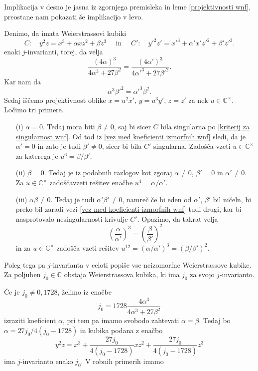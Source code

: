\documentclass[mat1]{fmfdelo}
\newcommand{\C}{\mathbb C}
\newcommand{\CM}{\mathbb C ^\times}
\theoremstyle{definition}
\begin{document}
\begin{dokaz}
    Implikacija v desno je jasna iz zgornjega premisleka in leme \ref{projektivnosti wnf}, preostane nam pokazati še implikacijo v levo. 

    Denimo, da imata Weierstrassovi kubiki
    \[
        C: \quad y^2z = x^3 + \alpha xz^2 + \beta z^3 \quad \text{ in } \quad
        C': \quad y'^2z' = x'^3 + \alpha' x'z'^2 + \beta' z'^3. 
    \]
    enaki $j$-invarianti, torej, da velja
    \[
        \frac{(4\alpha)^3}{4\alpha^3 + 27\beta^2} = \frac{(4\alpha')^3}{4\alpha'^3 + 27\beta'^2}.
    \]
    Kar nam da
    \begin{equation}
        \label{vez med koeficienti izmorfnih wnf}
        \alpha^3 \beta'^2 = \alpha'^3 \beta^2.
    \end{equation}
    Sedaj iščemo projektivnost oblike $x = u^2 x'$, $y = u^3 y'$, $z = z'$ za nek $u \in \CM$. Ločimo tri primere.

    \begin{itemize}
        \item[(i)]
        $\alpha = 0$. Tedaj mora biti $\beta \neq 0$, saj bi sicer $C$ bila singularna po \ref{kriterij za singularnost wnf}. Od tod iz \ref{vez med koeficienti izmorfnih wnf} sledi, da je $\alpha' = 0$ in zato je tudi $\beta' \neq 0$, sicer bi bila $C'$ singularna. Zadošča vzeti $u \in \CM$ za katerega je $u^6 = \beta/\beta'$.
        \item[(ii)]
        $\beta = 0$. Tedaj je iz podobnih razlogov kot zgoraj $\alpha \neq 0$, $\beta' = 0$ in $\alpha' \neq 0$. Za $u \in \CM$ zadoščavzeti rešitev enačbe $u^4 = \alpha/\alpha'$.
        \item[(iii)]
        $\alpha\beta \neq 0$. Tedaj je tudi $\alpha'\beta' \neq 0$, namreč če bi eden od $\alpha'$, $\beta'$ bil ničeln, bi preko bil zaradi vezi \ref{vez med koeficienti izmorfnih wnf} tudi drugi, kar bi nasprotovalo nesingularnosti krivulje $C'$. Opazimo, da takrat velja
        \[
            \left(\frac{\alpha}{\alpha'}\right)^3 = \left(\frac{\beta}{\beta'}\right)^2
        \]
        in za $u \in \CM$ zadošča vzeti rešitev $u^{12} = (\alpha/\alpha')^3 = (\beta/\beta')^2$.
    \end{itemize}
\end{dokaz}

Poleg tega pa $j$-invarianta v celoti popiše vse neizomorfne Weierstrassove kubike. Za poljuben $j_0 \in \C$ obstaja Weierstrassova kubika, ki ima $j_0$ za svojo $j$-invarianto.

Če je $j_0 \neq 0, 1728$, želimo iz enačbe
\[
    j_0 = 1728\frac{4\alpha^3}{4\alpha^3 + 27\beta^2}  
\]
izraziti koeficient $\alpha$, pri tem pa imamo svobodo zahtevati $\alpha = \beta$. Tedaj bo $\alpha = 27j_0/4(j_0 - 1728)$ in kubika podana z enačbo 
\[
  y^2z = x^3 + \frac{27j_0}{4(j_0 - 1728)}xz^2 + \frac{27j_0}{4(j_0 - 1728)}z^3
\] 
ima $j$-invarianto enako $j_0$. V robnih primerih imamo
\end{document}
